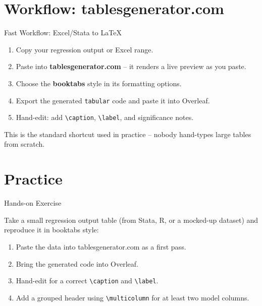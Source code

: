\documentclass[11pt,aspectratio=169]{beamer}
\begin{document}
\section{Workflow: tablesgenerator.com}

\begin{frame}{Fast Workflow: Excel/Stata to LaTeX}
  \small
  \begin{enumerate}
    \item Copy your regression output or Excel range.
    \item Paste into \textbf{tablesgenerator.com} -- it renders a live preview as you paste.
    \item Choose the \textbf{booktabs} style in its formatting options.
    \item Export the generated \texttt{tabular} code and paste it into Overleaf.
    \item Hand-edit: add \texttt{\textbackslash caption}, \texttt{\textbackslash label}, and significance notes.
  \end{enumerate}
  \vspace{4pt}
  This is the standard shortcut used in practice -- nobody hand-types
  large tables from scratch.
\end{frame}

\section{Practice}

\begin{frame}{Hands-on Exercise}
  \begin{exercisebox}
    Take a small regression output table (from Stata, R, or a mocked-up
    dataset) and reproduce it in booktabs style:
    \begin{enumerate}
      \item Paste the data into tablesgenerator.com as a first pass.
      \item Bring the generated code into Overleaf.
      \item Hand-edit for a correct \texttt{\textbackslash caption} and \texttt{\textbackslash label}.
      \item Add a grouped header using \texttt{\textbackslash multicolumn} for at least two model columns.
    \end{enumerate}
  \end{exercisebox}
\end{frame}
\end{document}
